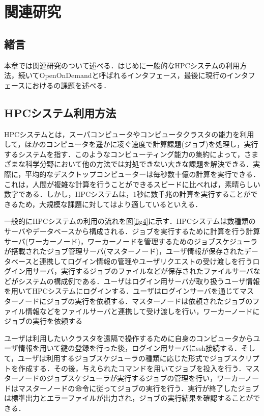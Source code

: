 
\section{関連研究}

\subsection{緒言}
本章では関連研究のついて述べる．はじめに一般的なHPCシステムの利用方法，続いてOpenOnDemandと呼ばれるインタフェース，最後に現行のインタフェースにおけるの課題を述べる．

\subsection{HPCシステム利用方法}
HPCシステムとは，スーパコンピュータやコンピュータクラスタの能力を利用して，ほかのコンピュータを遥かに凌ぐ速度で計算課題(ジョブ)を処理し，実行するシステムを指す．このようなコンピューティング能力の集約によって，さまざまな科学分野において他の方法では対処できない大きな課題を解決できる．実際に，平均的なデスクトップコンピューターは毎秒数十億の計算を実行できる．これは，人間が複雑な計算を行うことができるスピードに比べれば，素晴らしい数字である．しかし，HPCシステムは，1秒に数千兆の計算を実行することができるため，大規模な課題に対してはより適しているといえる．\par
一般的にHPCシステムの利用の流れを図\ref{fig4}に示す．HPCシステムは数種類のサーバやデータベースから構成される．ジョブを実行するために計算を行う計算サーバ(ワーカーノード)，ワーカーノードを管理するためのジョブスケジューラが搭載されたジョブ管理サーバ(マスターノード)，ユーザ情報が保存されたデータベースと連携してログイン情報の管理やユーザリクエストの受け渡しを行うログイン用サーバ，実行するジョブのファイルなどが保存されたファイルサーバなどがシステムの構成例である．ユーザはログイン用サーバが取り扱うユーザ情報を用いてHPCシステムにログインする．ユーザはログインサーバを通じてマスターノードにジョブの実行を依頼する．マスターノードは依頼されたジョブのファイル情報などをファイルサーバと連携して受け渡しを行い，ワーカーノードにジョブの実行を依頼する\par
ユーザは利用したいクラスタを遠隔で操作するために自身のコンピュータからユーザ情報を用いて鍵の登録を行った後，ログイン用サーバにssh接続する．そして，ユーザは利用するジョブスケジューラの種類に応じた形式でジョブスクリプトを作成する．その後，与えられたコマンドを用いてジョブを投入を行う．マスターノードのジョブスケジューラが実行するジョブの管理を行い，ワーカーノードはマスターノードの命令に従ってジョブの実行を行う．実行が終了したジョブは標準出力とエラーファイルが出力され，ジョブの実行結果を確認することができる．\par

